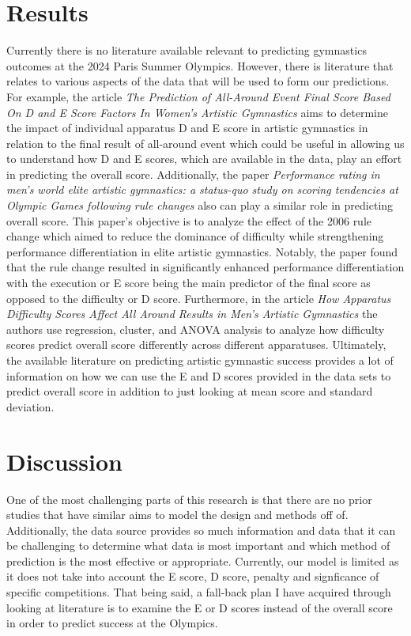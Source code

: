 \documentclass[12pt]{article}
\begin{document}
\section{Results}
\label{sec:res}

Currently there is no literature available relevant to predicting gymnastics outcomes at the 2024 
Paris Summer Olympics. However, there is literature that relates to various aspects of the data that 
will be used to form our predictions. For example, the article \textit{The Prediction of All-Around 
Event Final Score Based On D and E Score Factors In Women's Artistic Gymnastics} aims to determine the 
impact of individual apparatus D and E score in artistic gymnastics in relation to the final result of 
all-around event which could be useful in allowing us to understand how D and E scores, which are 
available in the data, play an effort in predicting the overall score. Additionally, the paper 
\textit{Performance rating in men’s world elite artistic gymnastics: a status-quo study on scoring 
tendencies at Olympic Games following rule changes} also can play a similar role in predicting overall 
score. This paper's objective is to analyze the effect of the 2006 rule change which aimed to reduce the 
dominance of difficulty while strengthening performance differentiation  in elite artistic gymnastics. 
Notably, the paper found that the rule change resulted in significantly enhanced performance 
differentiation with the execution or E score being the main predictor of the final score as opposed to 
the difficulty or D score. Furthermore, in the article \textit{How Apparatus Difficulty Scores Affect All 
Around Results in Men's Artistic Gymnastics} the authors use regression, cluster, and ANOVA analysis to 
analyze how difficulty scores predict overall score differently across different apparatuses. Ultimately, 
the available literature on predicting artistic gymnastic success provides a lot of information on how we 
can use the E and D scores provided in the data sets to predict overall score in addition to just looking 
at mean score and standard deviation.

\section{Discussion}
\label{sec:dis}

One of the most challenging parts of this research is that there are no prior studies that have similar
aims to model the design and methods off of. Additionally, the data source provides so much information
and data that it can be challenging to determine what data is most important and which method of prediction
is the most effective or appropriate. Currently, our model is limited as it does not take into account the 
E score, D score, penalty and signficance of specific competitions. That being said, a fall-back plan I have 
acquired through looking at literature is to examine the E or D scores instead of the overall score in order 
to predict success at the Olympics. 
\end{document}

